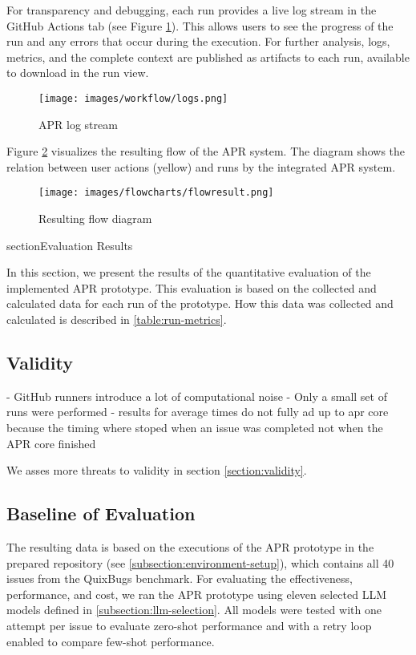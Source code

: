 
For transparency and debugging, each run provides a live log stream in the GitHub Actions tab (see Figure \ref{fig:log-stream}). This allows users to see the progress of the run and any errors that occur during the execution. For further analysis, logs, metrics, and the complete context are published as artifacts to each run, available to download in the run view.
\begin{figure}[H]
    \centering
    \texttt{[image: images/workflow/logs.png]}
    \caption{APR log stream}
    \label{fig:log-stream}
\end{figure}

Figure \ref{fig:flow} visualizes the resulting flow of the APR system. The diagram shows the relation between user actions (yellow) and runs by the integrated APR system.

\begin{figure}[H]
    \centering
    \texttt{[image: images/flowcharts/flowresult.png]}
    \caption{Resulting flow diagram}
    \label{fig:flow}
\end{figure}

section{Evaluation Results} \label{section:evaluation-results}

In this section, we present the results of the quantitative evaluation of the implemented APR prototype. This evaluation is based on the collected and calculated data for each run of the prototype. How this data was collected and calculated is described in \ref{table:run-metrics}.

\subsection{Validity}

- GitHub runners introduce a lot of computational noise
- Only a small set of runs were performed
- results for average times do not fully ad up to apr core because the timing where stoped when an issue was completed not when the APR core finished 

We asses more threats to validity in section \ref{section:validity}.

\subsection{Baseline of Evaluation}

The resulting data is based on the executions of the APR prototype in the prepared repository (see \ref{subsection:environment-setup}), which contains all 40 issues from the QuixBugs benchmark. For evaluating the effectiveness, performance, and cost, we ran the APR prototype using eleven selected LLM models defined in \ref{subsection:llm-selection}. All models were tested with one attempt per issue to evaluate zero-shot performance and with a retry loop enabled to compare few-shot performance.

